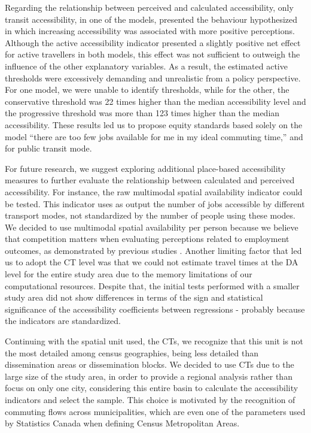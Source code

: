 \documentclass[preprint, 3p,
authoryear]{elsarticle} %
\begin{document}
Regarding the relationship between perceived and calculated
accessibility, only transit accessibility, in one of the models,
presented the behaviour hypothesized in which increasing accessibility
was associated with more positive perceptions. Although the active
accessibility indicator presented a slightly positive net effect for
active travellers in both models, this effect was not sufficient to
outweigh the influence of the other explanatory variables. As a result,
the estimated active thresholds were excessively demanding and
unrealistic from a policy perspective. For one model, we were unable to
identify thresholds, while for the other, the conservative threshold was
22 times higher than the median accessibility level and the progressive
threshold was more than 123 times higher than the median accessibility.
These results led us to propose equity standards based solely on the
model ``there are too few jobs available for me in my ideal commuting
time,'' and for public transit mode.

For future research, we suggest exploring additional place-based
accessibility measures to further evaluate the relationship between
calculated and perceived accessibility. For instance, the raw multimodal
spatial availability indicator could be tested. This indicator uses as
output the number of jobs accessible by different transport modes, not
standardized by the number of people using these modes. We decided to
use multimodal spatial availability per person because we believe that
competition matters when evaluating perceptions related to employment
outcomes, as demonstrated by previous studies
\citep{jin2018, merlin2017, miller2005}. Another limiting factor that
led us to adopt the CT level was that we could not estimate travel times
at the DA level for the entire study area due to the memory limitations
of our computational resources. Despite that, the initial tests
performed with a smaller study area did not show differences in terms of
the sign and statistical significance of the accessibility coefficients
between regressions - probably because the indicators are standardized.

Continuing with the spatial unit used, the CTs, we recognize that this
unit is not the most detailed among census geographies, being less
detailed than dissemination areas or dissemination blocks. We decided to
use CTs due to the large size of the study area, in order to provide a
regional analysis rather than focus on only one city, considering this
entire basin to calculate the accessibility indicators and select the
sample. This choice is motivated by the recognition of commuting flows
across municipalities, which are even one of the parameters used by
Statistics Canada when defining Census Metropolitan Areas.
\end{document}
